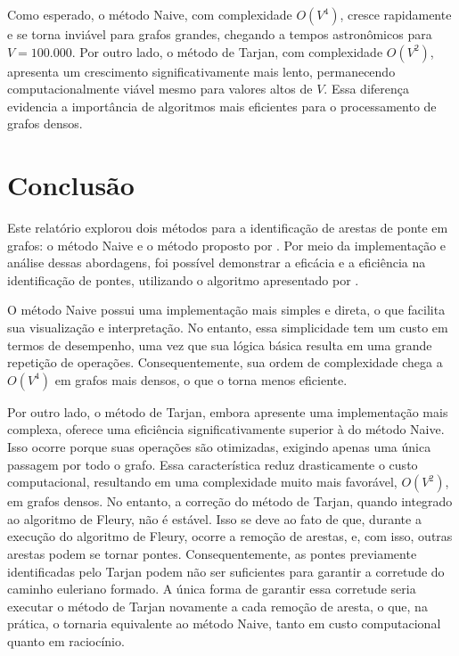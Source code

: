 \documentclass{sbc2023}%
\begin{document}
Como esperado, o método Naive, com complexidade \(O(V^4)\), cresce rapidamente e se torna inviável para grafos grandes, chegando a tempos astronômicos para \(V = 100.000\). Por outro lado, o método de Tarjan, com complexidade \(O(V^2)\), apresenta um crescimento significativamente mais lento, permanecendo computacionalmente viável mesmo para valores altos de \(V\). Essa diferença evidencia a importância de algoritmos mais eficientes para o processamento de grafos densos.



\section{Conclusão}
Este relatório explorou dois métodos para a identificação de arestas de ponte em grafos: o método Naive e o método proposto por \cite{ref5}. Por meio da implementação e análise dessas abordagens, foi possível demonstrar a eficácia e a eficiência na identificação de pontes, utilizando o algoritmo apresentado por \cite{ref6}.

O método Naive possui uma implementação mais simples e direta, o que facilita sua visualização e interpretação. No entanto, essa simplicidade tem um custo em termos de desempenho, uma vez que sua lógica básica resulta em uma grande repetição de operações. Consequentemente, sua ordem de complexidade chega a \(O(V^4)\) em grafos mais densos, o que o torna menos eficiente.

Por outro lado, o método de Tarjan, embora apresente uma implementação mais complexa, oferece uma eficiência significativamente superior à do método Naive. Isso ocorre porque suas operações são otimizadas, exigindo apenas uma única passagem por todo o grafo. Essa característica reduz drasticamente o custo computacional, resultando em uma complexidade muito mais favorável, 
\(O(V^2)\), em grafos densos. No entanto, a correção do método de Tarjan, quando integrado ao algoritmo de Fleury, não é estável. Isso se deve ao fato de que, durante a execução do algoritmo de Fleury, ocorre a remoção de arestas, e, com isso, outras arestas podem se tornar pontes. Consequentemente, as pontes previamente identificadas pelo Tarjan podem não ser suficientes para garantir a corretude do caminho euleriano formado. A única forma de garantir essa corretude seria executar o método de Tarjan novamente a cada remoção de aresta, o que, na prática, o tornaria equivalente ao método Naive, tanto em custo computacional quanto em raciocínio.
\end{document}

